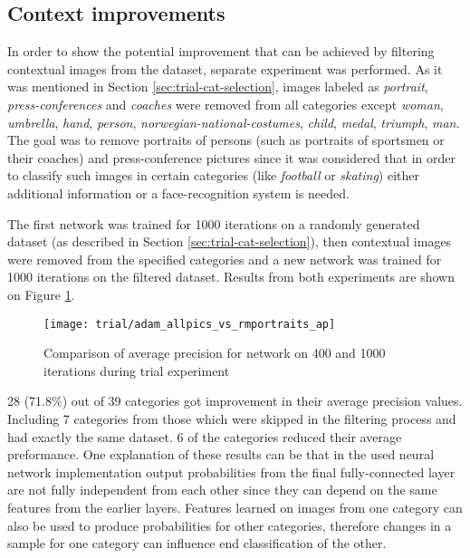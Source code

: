 \subsection{Context improvements}
    In order to show the potential improvement that can be achieved by filtering contextual images from the dataset, separate experiment was performed. As it was mentioned in Section \ref{sec:trial-cat-selection}, images labeled as \textit{portrait}, \textit{press-conferences} and \textit{coaches} were removed from all categories except \textit{woman}, \textit{umbrella}, \textit{hand}, \textit{person}, \textit{norwegian-national-costumes}, \textit{child}, \textit{medal}, \textit{triumph}, \textit{man}. The goal was to remove portraits of persons (such as portraits of sportsmen or their coaches) and press-conference pictures since it was considered that in order to classify such images in certain categories (like \textit{football} or \textit{skating}) either additional information or a face-recognition system is needed.
    
    The first network was trained for 1000 iterations on a randomly generated dataset (as described in Section \ref{sec:trial-cat-selection}), then contextual images were removed from the specified categories and a new network was trained for 1000 iterations on the filtered dataset. Results from both experiments are shown on Figure \ref{fig:trial-allpics-vs-rmportraits}.
    
    \begin{figure}[H]
        \centering
        \texttt{[image: trial/adam\_allpics\_vs\_rmportraits\_ap]}
        \caption{Comparison of average precision for network on 400 and 1000 iterations during trial experiment}
        \label{fig:trial-allpics-vs-rmportraits}
    \end{figure}
    
    28 (71.8\%) out of 39 categories got improvement in their average precision values. Including 7 categories from those which were skipped in the filtering process and had exactly the same dataset. 6 of the categories reduced their average preformance. One explanation of these results can be that in the used neural network implementation output probabilities from the final fully-connected layer are not fully independent from each other since they can depend on the same features from the earlier layers. Features learned on images from one category can also be used to produce probabilities for other categories, therefore changes in a sample for one category can influence end classification of the other.
    
